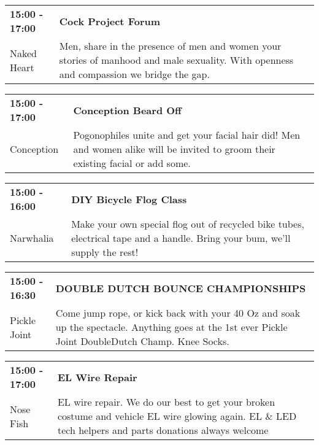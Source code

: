 \begin{tabular}{ p{1in} p{2.2in} }
    \textbf{15:00 - 17:00} & \textbf{Cock Project Forum} \\
    Naked Heart \newline  & Men, share in the presence of men and women your stories of manhood and male sexuality. With openness and compassion we bridge the gap. \\
    \hline 
\end{tabular}
    
\begin{tabular}{ p{1in} p{2.2in} }
    \textbf{15:00 - 17:00} & \textbf{Conception Beard Off } \\
    Conception \newline  & Pogonophiles unite and get your facial hair did! Men and women alike will be invited to groom their existing facial or add some. \\
    \hline 
\end{tabular}
    
\begin{tabular}{ p{1in} p{2.2in} }
    \textbf{15:00 - 16:00} & \textbf{DIY Bicycle Flog Class} \\
    Narwhalia \newline  & Make your own special flog out of recycled bike tubes, electrical tape and a handle. Bring your bum, we'll supply the rest! \\
    \hline 
\end{tabular}
    
\begin{tabular}{ p{1in} p{2.2in} }
    \textbf{15:00 - 16:30} & \textbf{DOUBLE DUTCH BOUNCE CHAMPIONSHIPS} \\
    Pickle Joint \newline  & Come jump rope, or kick back with your 40 Oz and soak up the spectacle. Anything goes at the 1st ever Pickle Joint DoubleDutch Champ.  Knee Socks. \\
    \hline 
\end{tabular}
    
\begin{tabular}{ p{1in} p{2.2in} }
    \textbf{15:00 - 17:00} & \textbf{EL Wire Repair} \\
    Nose Fish \newline  & EL wire repair. We do our best to get your broken costume and vehicle EL wire glowing again. EL \& LED tech helpers and parts donations always welcome \\
    \hline 
\end{tabular}
    

